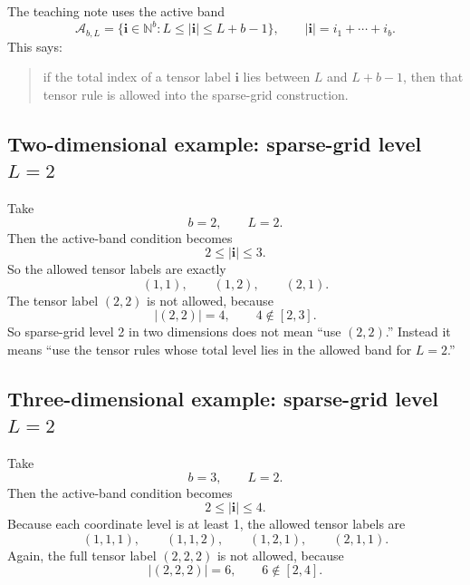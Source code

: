 \documentclass[11pt]{article}
\begin{document}
The teaching note uses the active band
\begin{equation}
  \mathcal A_{b,L}
  =
  \{\mathbf i\in\mathbb N^b: L\le |\mathbf i|\le L+b-1\},
  \qquad
  |\mathbf i|=i_1+\cdots+i_b.
  \label{eq:active-band}
\end{equation}
This says:
\begin{quote}
if the total index of a tensor label \(\mathbf i\) lies between \(L\) and
\(L+b-1\), then that tensor rule is allowed into the sparse-grid construction.
\end{quote}

\subsection{Two-dimensional example: sparse-grid level \texorpdfstring{\(L=2\)}{L=2}}

Take
\[
  b=2,
  \qquad
  L=2.
\]
Then the active-band condition becomes
\[
  2\le |\mathbf i|\le 3.
\]
So the allowed tensor labels are exactly
\begin{equation}
  (1,1),\qquad (1,2),\qquad (2,1).
  \label{eq:2d-active-rules}
\end{equation}
The tensor label \((2,2)\) is not allowed, because
\begin{equation}
  |(2,2)|=4,
  \qquad
  4\notin [2,3].
  \label{eq:22-not-active}
\end{equation}
So sparse-grid level 2 in two dimensions does not mean ``use \((2,2)\).''
Instead it means ``use the tensor rules whose total level lies in the allowed
band for \(L=2\).''

\subsection{Three-dimensional example: sparse-grid level \texorpdfstring{\(L=2\)}{L=2}}

Take
\[
  b=3,
  \qquad
  L=2.
\]
Then the active-band condition becomes
\[
  2\le |\mathbf i|\le 4.
\]
Because each coordinate level is at least 1, the allowed tensor labels are
\begin{equation}
  (1,1,1),\qquad (1,1,2),\qquad (1,2,1),\qquad (2,1,1).
  \label{eq:3d-active-rules-level-section}
\end{equation}
Again, the full tensor label \((2,2,2)\) is not allowed, because
\begin{equation}
  |(2,2,2)|=6,
  \qquad
  6\notin [2,4].
  \label{eq:222-not-active}
\end{equation}
\end{document}
